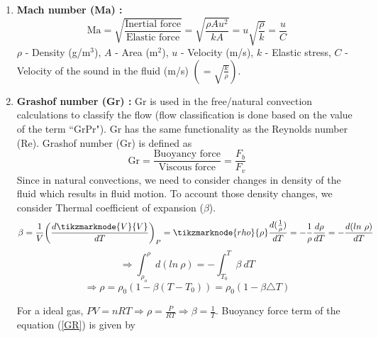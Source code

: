 \documentclass[a4paper, 12 pt]{article}
\begin{document}
\begin{enumerate}
    \item \textbf{Mach number (Ma) :} $$\text{Ma}=\sqrt{\frac{\text{Inertial force}}{\text{Elastic force}}}=\sqrt{\frac{\rho A u^2}{kA}}=u\sqrt{\frac{\rho}{k}}=\frac{u}{C}$$
    $\rho$ - Density (g/m$^3$), $A$ - Area (m$^2$), $u$ - Velocity (m/s), $k$ - Elastic stress, $C$ - Velocity of the sound in the fluid (m/s) $(=\sqrt{\frac{k}{\rho}})$.
    
    \item \textbf{Grashof number (Gr) :} Gr is used in the free/natural convection calculations to classify the flow (flow classification is done based on the value of the term ``GrPr"). Gr has the same functionality as the Reynolds number (Re). Grashof number (Gr) is defined as
    \begin{equation}\label{GR}
        \text{Gr}=\frac{\text{Buoyancy force}}{\text{Viscous force}}=\frac{F_b}{F_v}
    \end{equation}
    Since in natural convections, we need to consider changes in density of the fluid which results in fluid motion. To account those density changes, we consider Thermal coefficient of expansion ($\beta$).\vspace{1 cm}
    \begin{equation}
        \beta=\frac{1}{V}\bigg(\frac{d\tikzmarknode{V}{V}}{dT}\bigg)_P=\tikzmarknode{rho}{\rho}\frac{d(\frac{1}{\rho})}{dT}=-\frac{1}{\rho}\frac{d\rho}{dT}=-\frac{d(ln\ \rho)}{dT}
    \end{equation}\vspace{2 mm}
    \begin{equation}
        \Rightarrow \int_{\rho _o}^{\rho} d(ln\ \rho) = -\int_{T_0}^{T} \beta\ dT    
    \end{equation}
    \begin{equation}\label{RHO}
        \Rightarrow\boxed{\rho =\rho_0(1-\beta(T-T_{0}))=\rho_0(1-\beta\triangle T)}    
    \end{equation}
     
    
    For a ideal gas, $PV=nRT\Rightarrow \rho=\frac{P}{RT}\Rightarrow \beta=\frac{1}{T}$. Buoyancy force term of the equation (\ref{GR}) is given by
    

\end{enumerate}
\end{document}
